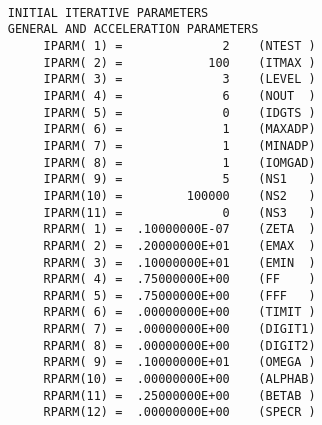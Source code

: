 \begin{verbatim}
 
     INITIAL ITERATIVE PARAMETERS
     GENERAL AND ACCELERATION PARAMETERS
          IPARM( 1) =              2    (NTEST )
          IPARM( 2) =            100    (ITMAX )
          IPARM( 3) =              3    (LEVEL )
          IPARM( 4) =              6    (NOUT  )
          IPARM( 5) =              0    (IDGTS )
          IPARM( 6) =              1    (MAXADP)
          IPARM( 7) =              1    (MINADP)
          IPARM( 8) =              1    (IOMGAD)
          IPARM( 9) =              5    (NS1   )
          IPARM(10) =         100000    (NS2   )
          IPARM(11) =              0    (NS3   )
          RPARM( 1) =  .10000000E-07    (ZETA  )
          RPARM( 2) =  .20000000E+01    (EMAX  )
          RPARM( 3) =  .10000000E+01    (EMIN  )
          RPARM( 4) =  .75000000E+00    (FF    )
          RPARM( 5) =  .75000000E+00    (FFF   )
          RPARM( 6) =  .00000000E+00    (TIMIT )
          RPARM( 7) =  .00000000E+00    (DIGIT1)
          RPARM( 8) =  .00000000E+00    (DIGIT2)
          RPARM( 9) =  .10000000E+01    (OMEGA )
          RPARM(10) =  .00000000E+00    (ALPHAB)
          RPARM(11) =  .25000000E+00    (BETAB )
          RPARM(12) =  .00000000E+00    (SPECR )
\end{verbatim}
\newpage
